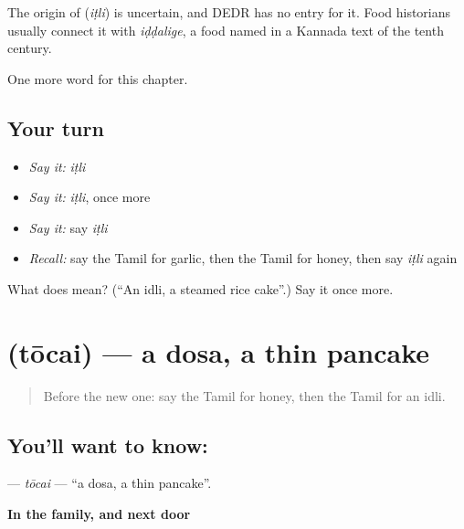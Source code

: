 \begin{cousinweb}
The origin of \textbf{} (\emph{iṭli}) is uncertain, and DEDR has no entry for it. Food historians usually connect it with \emph{iḍḍalige}, a food named in a Kannada text of the tenth century.
\end{cousinweb}

\begin{grammarlens}[title={What you've built}]
One more word for this chapter.
\end{grammarlens}

\subsection*{Your turn}
\begin{itemize}
\raggedright
  \item \emph{Say it:} \emph{iṭli}
  \item \emph{Say it:} \emph{iṭli}, once more
  \item \emph{Say it:} say \emph{iṭli}
  \item \emph{Recall:} say the Tamil for garlic, then the Tamil for honey, then say \emph{iṭli} again
\end{itemize}

\begin{tcolorbox}[breakable,colback=teal!4,colframe=teal!35!black,title={Before you move on}]
What does  mean? (\textquotedblleft{}An idli, a steamed rice cake\textquotedblright{}.) Say it once more.
\end{tcolorbox}
\section[\texorpdfstring{\ta{தோசை} (tōcai)}{தோசை (tōcai)}]{ (tōcai) — a dosa, a thin pancake}

\label{lesson:TA-C125-tocai}



\begin{quote}
Before the new one: say the Tamil for honey, then the Tamil for an idli.
\end{quote}

\subsection*{You'll want to know: }
\textbf{} — \emph{tōcai} — \textquotedblleft{}a dosa, a thin pancake\textquotedblright{}.

\textbf{In the family, and next door}

